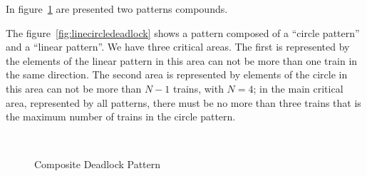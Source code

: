 \documentclass{ewic}
\begin{document}

In figure~\ref{fig:compdeadlockpattern} are presented two patterns compounds.


The figure~\ref{fig:linecircledeadlock}  shows a pattern composed of a ``circle pattern'' and a ``linear pattern''. We have three critical areas. The first is represented by the elements of the linear pattern in this area can not be more than one train in the same direction.  The second area is represented by elements of the circle in this area can not be more than $N-1$ trains, with $N=4$; in the main critical area, represented by all patterns,  there must be no more than three trains that is the maximum number of trains in the circle pattern.

\begin{figure}[!htp]
 \centering

 
 \\

\caption{Composite Deadlock Pattern}
 \label{fig:compdeadlockpattern}
 \end{figure}
\end{document}
